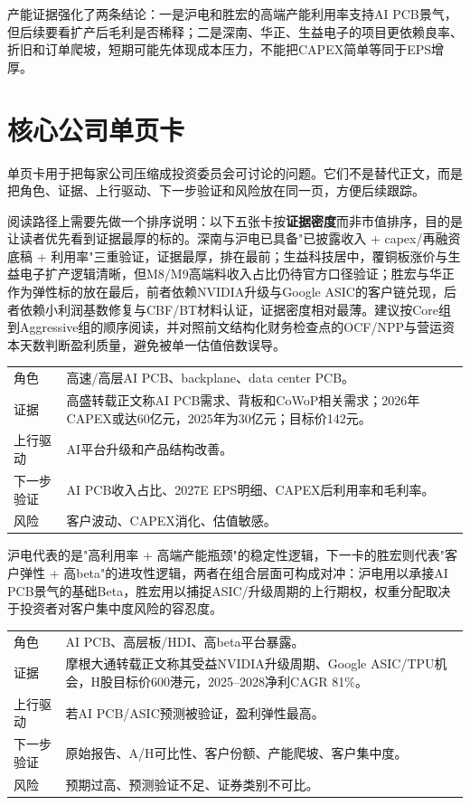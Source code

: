 产能证据强化了两条结论：一是沪电和胜宏的高端产能利用率支持AI PCB景气，但后续要看扩产后毛利是否稀释；二是深南、华正、生益电子的项目更依赖良率、折旧和订单爬坡，短期可能先体现成本压力，不能把CAPEX简单等同于EPS增厚。

\section{核心公司单页卡}

单页卡用于把每家公司压缩成投资委员会可讨论的问题。它们不是替代正文，而是把角色、证据、上行驱动、下一步验证和风险放在同一页，方便后续跟踪。

阅读路径上需要先做一个排序说明：以下五张卡按\textbf{证据密度}而非市值排序，目的是让读者优先看到证据最厚的标的。深南与沪电已具备"已披露收入 + capex/再融资底稿 + 利用率"三重验证，证据最厚，排在最前；生益科技居中，覆铜板涨价与生益电子扩产逻辑清晰，但M8/M9高端料收入占比仍待官方口径验证；胜宏与华正作为弹性标的放在最后，前者依赖NVIDIA升级与Google ASIC的客户链兑现，后者依赖小利润基数修复与CBF/BT材料认证，证据密度相对最薄。建议按Core组到Aggressive组的顺序阅读，并对照前文结构化财务检查点的OCF/NPP与营运资本天数判断盈利质量，避免被单一估值倍数误导。

\begin{exhibitbox}
\small
\begin{tabularx}{\textwidth}{L{2.6cm}X}
\toprule
角色 & 高速/高层AI PCB、backplane、data center PCB。 \\
证据 & 高盛转载正文称AI PCB需求、背板和CoWoP相关需求；2026年CAPEX或达60亿元，2025年为30亿元；目标价142元。 \\
上行驱动 & AI平台升级和产品结构改善。 \\
下一步验证 & AI PCB收入占比、2027E EPS明细、CAPEX后利用率和毛利率。 \\
风险 & 客户波动、CAPEX消化、估值敏感。 \\
\bottomrule
\end{tabularx}
\end{exhibitbox}

沪电代表的是"高利用率 + 高端产能瓶颈"的稳定性逻辑，下一卡的胜宏则代表"客户弹性 + 高beta"的进攻性逻辑，两者在组合层面可构成对冲：沪电用以承接AI PCB景气的基础Beta，胜宏用以捕捉ASIC/升级周期的上行期权，权重分配取决于投资者对客户集中度风险的容忍度。

\begin{exhibitbox}
\small
\begin{tabularx}{\textwidth}{L{2.6cm}X}
\toprule
角色 & AI PCB、高层板/HDI、高beta平台暴露。 \\
证据 & 摩根大通转载正文称其受益NVIDIA升级周期、Google ASIC/TPU机会，H股目标价600港元，2025--2028净利CAGR 81\%。 \\
上行驱动 & 若AI PCB/ASIC预测被验证，盈利弹性最高。 \\
下一步验证 & 原始报告、A/H可比性、客户份额、产能爬坡、客户集中度。 \\
风险 & 预期过高、预测验证不足、证券类别不可比。 \\
\bottomrule
\end{tabularx}
\end{exhibitbox}

